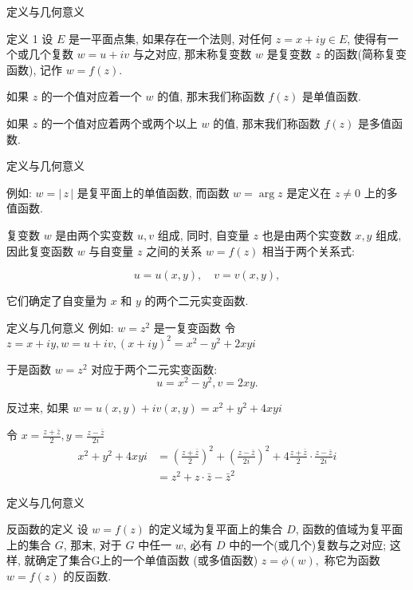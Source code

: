 \documentclass{beamer}
\begin{document}
\begin{frame}{定义与几何意义}
\begin{block}{定义 1}
设 $ E $ 是一平面点集, 如果存在一个法则, 对任何 $ z = x + iy \in E $,  使得有一个或几个复数 $ w = u + iv $ 与之对应, 那末称复变数 $ w $ 是复变数 $ z $ 的函数(简称复变函数), 记作 $ w = f(z) $. 
\bigskip

如果 $ z $ 的一个值对应着一个 $ w $ 的值, 那末我们称函数 $ f(z) $ 是单值函数.
\bigskip

如果 $ z $ 的一个值对应着两个或两个以上 $ w $ 的值, 那末我们称函数 $ f(z) $ 是多值函数.
\end{block}

\end{frame}
\begin{frame}{定义与几何意义}

例如: $ w = \left| {\, z\, } \right| $ 是复平面上的单值函数, 而函数 $ w = \arg z $ 是定义在 $ z \ne 0 $ 上的多值函数.
\bigskip

复变数 $ w $ 是由两个实变数 $ u, v $ 组成, 同时, 自变量 $ z $ 也是由两个实变数 $ x, y $ 组成, 因此复变函数 $ w $ 与自变量 $ z $ 之间的关系 $ w = f(z) $ 相当于两个关系式: 

\[u = u(x, y), \quad v = v(x, y), \]
\bigskip

它们确定了自变量为 $ x $ 和 $ y $ 的两个二元实变函数.
\end{frame}

\begin{frame}{定义与几何意义}
例如: $ w = {z^2} $ 是一复变函数
令 $ z = x + iy, w = u + iv, {(x + iy)^2}= {x^2} - {y^2} + 2xyi $ 

于是函数 $ w = {z^2} $ 对应于两个二元实变函数: 
\[u = {x^2} - {y^2}, v = 2xy.\]

反过来, 如果 $ w = u(x, y) + iv(x, y) = {x^2} + {y^2} + 4xyi $ 

令 $ x = \frac{{z + \bar z}}{2}, y = \frac{{z - \bar z}}{{2i}} $ 
\begin{align*}
{x^2} + {y^2} + 4xyi &= {\left( {\frac{{z + \bar z}}{2}} \right)^2} + {\left( {\frac{{z - \bar z}}{{2i}}} \right)^2} + 4\frac{{z + \bar z}}{2} \cdot \frac{{z - \bar z}}{{2i}}i\\
& = {z^2} + z \cdot \bar z - {\bar z^2}
\end{align*}

\end{frame}


\begin{frame}{定义与几何意义}
\begin{block}{反函数的定义}
设 $ w = f(z) $ 的定义域为复平面上的集合 $ D $,  函数的值域为复平面上的集合 $ G $,  那末, 对于 $ G $ 中任一 $ w $, 必有 $ D $ 中的一个(或几个)复数与之对应; 这样, 就确定了集合G上的一个单值函数 (或多值函数) $ z = \phi (w),  $ 称它为函数 $ w = f(z) $ 的反函数.
\end{block}
\end{frame}
\end{document}
